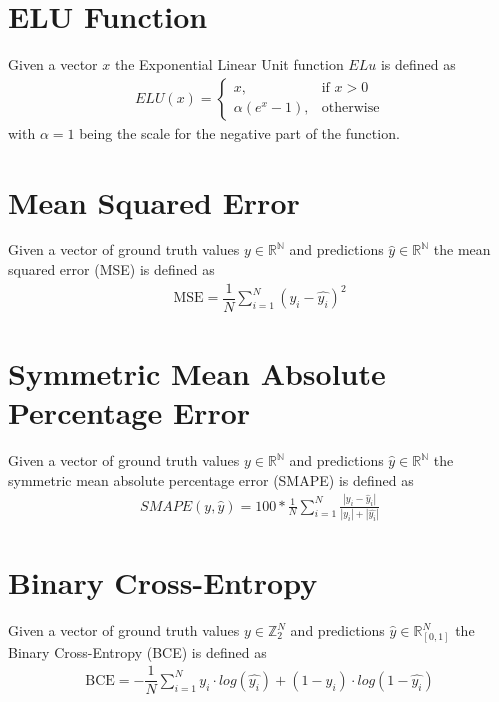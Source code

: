 \section{ELU Function}
Given a vector $x$ the Exponential Linear Unit function $ELu$ is defined as 
\begin{gather}
    \label{elu}
    ELU(x) = 
    \begin{cases}
        x,& \text{if } x > 0 \\
        \alpha (e^{x} -1),              & \text{otherwise}
    \end{cases}
\end{gather}
with $\alpha=1$ being the scale for the negative part of the function.

\section{Mean Squared Error}
Given a vector of ground truth values $y \in \mathbb{R^N}$ and predictions $\widehat{y} \in \mathbb{R^N}$ the mean squared error (MSE) is defined as 
\begin{gather}
\label{mse}
    \text{MSE}=
        \dfrac
            {1}
            {N}
            \sum\limits_{i=1}^{N}  (y_i - \hat{y_i})^2
\end{gather}

\section{Symmetric Mean Absolute Percentage Error}
Given a vector of ground truth values $y \in \mathbb{R^N}$ and predictions $\widehat{y} \in \mathbb{R^N}$ the symmetric mean absolute percentage error (SMAPE) is defined as 
\begin{equation}
  \begin{gathered} 
  \label{smape}
     SMAPE(y, \widehat{y}) = 100 *
    \frac{1}{N} 
    \sum_{i=1}^{N}
    \frac{| y_{i} - \widehat{y}_{i} |} {|y_{i}| + |\widehat{y_{i}}|}  
  \end{gathered}
\end{equation}

\section{Binary Cross-Entropy}
Given a vector of ground truth values $y \in \mathbb{Z}_2^N$ and predictions $\widehat{y} \in \mathbb{R}^N_{[0, 1]}$ the Binary Cross-Entropy (BCE)  is defined as 
\begin{gather}
\label{bce}
    \text{BCE}=
        -\dfrac
            {1}
            {N}
        \sum\limits_{i=1}^{N}  y_i \cdot log(\hat{y_i}) + (1-y_i) \cdot log(1 - \hat{y_i})
\end{gather}

